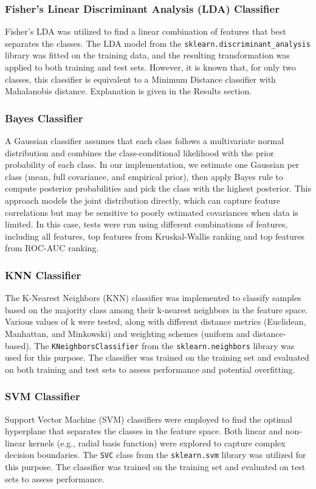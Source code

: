 \documentclass[12pt,a4paper]{article}
\begin{document}
\subsubsection{Fisher's Linear Discriminant Analysis (LDA) Classifier}
Fisher's LDA was utilized to find a linear combination of features that best separates the classes. The LDA model from the \texttt{sklearn.discriminant\_analysis} library was fitted on the training data, and the resulting transformation was applied to both training and test sets. However, it is known that, for only two classes, this classifier is equivalent to a Minimum Distance classifier with Mahalanobis distance. Explanation is given in the Results section.

\subsubsection{Bayes Classifier}
A Gaussian classifier assumes that each class follows a multivariate normal distribution and combines the class-conditional likelihood with the prior probability of each class. In our implementation, we estimate one Gaussian per class (mean, full covariance, and empirical prior), then apply Bayes rule to compute posterior probabilities and pick the class with the highest posterior. This approach models the joint distribution directly, which can capture feature correlations but may be sensitive to poorly estimated covariances when data is limited. In this case, tests were run using different combinations of features, including all features, top features from Kruskal-Wallis ranking and top features from ROC-AUC ranking. 

\subsubsection{KNN Classifier}
The K-Nearest Neighbors (KNN) classifier was implemented to classify samples based on the majority class among their k-nearest neighbors in the feature space. Various values of k were tested, along with different distance metrics (Euclidean, Manhattan, and Minkowski) and weighting schemes (uniform and distance-based). The \texttt{KNeighborsClassifier} from the \texttt{sklearn.neighbors} library was used for this purpose. The classifier was trained on the training set and evaluated on both training and test sets to assess performance and potential overfitting.

\subsubsection{SVM Classifier}
Support Vector Machine (SVM) classifiers were employed to find the optimal hyperplane that separates the classes in the feature space. Both linear and non-linear kernels (e.g., radial basis function) were explored to capture complex decision boundaries. The \texttt{SVC} class from the \texttt{sklearn.svm} library was utilized for this purpose. The classifier was trained on the training set and evaluated on test sets to assess performance.
\end{document}
